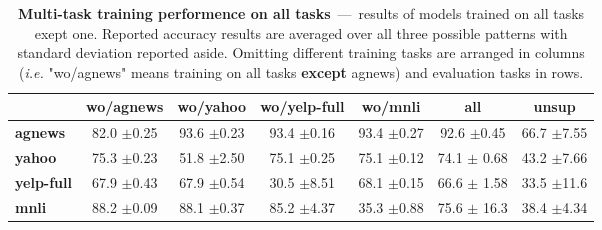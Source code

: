 \begin{table*}[ht]
	\centering
	\fontsize{9}{13}
	\selectfont
	\begin{tabular*}{\textwidth}{l@{\extracolsep{\fill}}cccccc}
		\toprule
		& \textbf{wo/agnews} & \textbf{wo/yahoo} & \textbf{wo/yelp-full} & \textbf{wo/mnli} & \textbf{all} & \textbf{unsup} \\
		\hline
		\textbf{agnews}    & 82.0 \tiny$\pm$0.25        & 93.6 \tiny$\pm$0.23        & 93.4   \tiny$\pm$0.16          & 93.4 \tiny$\pm$0.27       & 92.6 \tiny$\pm$0.45 & 66.7 \tiny$\pm$7.55 \\
		\textbf{yahoo}     & 75.3 \tiny$\pm$0.23        & 51.8 \tiny$\pm$2.50        & 75.1   \tiny$\pm$0.25          & 75.1 \tiny$\pm$0.12       & 74.1 \tiny$\pm$ 0.68  & 43.2 \tiny$\pm$7.66 \\
		\textbf{yelp-full} & 67.9 \tiny$\pm$0.43        & 67.9 \tiny$\pm$0.54        & 30.5   \tiny$\pm$8.51          & 68.1 \tiny$\pm$0.15       & 66.6 \tiny$\pm$ 1.58 & 33.5 \tiny$\pm$11.6 \\
		\textbf{mnli}      & 88.2 \tiny$\pm$0.09        & 88.1 \tiny$\pm$0.37        & 85.2   \tiny$\pm$4.37          & 35.3 \tiny$\pm$0.88      & 75.6 \tiny$\pm$ 16.3 & 38.4 \tiny$\pm$4.34 \\
		\bottomrule
	\end{tabular*}
	\caption{\textbf{Multi-task training performence on all tasks}~---~results of models trained on all tasks exept one. Reported accuracy results are averaged over all three possible patterns with standard deviation reported aside. Omitting different training tasks are arranged in columns (\textit{i.e.} "wo/agnews" means training on all tasks \textbf{except} agnews) and evaluation tasks in rows.}\label{tab:multi-on-train-set-summary}
\end{table*}
